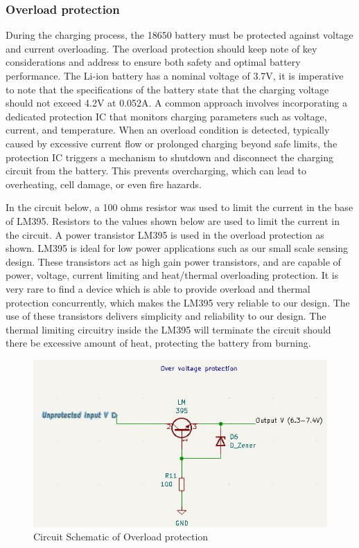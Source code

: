 \documentclass[class=report,11pt,crop=false]{standalone}
\begin{document}
	\subsubsection{Overload protection}
	\vspace{0.5cm}
	During the charging process, the 18650 battery must be protected against voltage and current overloading. The overload protection should keep note of key considerations and address to ensure both safety and optimal battery performance. The Li-ion battery has a nominal voltage of 3.7V, it is imperative to note that the specifications of the battery state that the charging voltage should not exceed 4.2V at 0.052A. A common approach involves incorporating a dedicated protection IC that monitors charging parameters such as voltage, current, and temperature. When an overload condition is detected, typically caused by excessive current flow or prolonged charging beyond safe limits, the protection IC triggers a mechanism to shutdown and disconnect the charging circuit from the battery. This prevents overcharging, which can lead to overheating, cell damage, or even fire hazards.
	
	In the circuit below, a 100 ohms resistor was used to limit the current in the base of LM395. Resistors to the values shown below are used to limit the current in the circuit. A power transistor LM395 is used in the overload protection as shown. LM395 is ideal for low power applications such as our small scale sensing design. These transistors act as high gain power transistors, and are capable of power, voltage, current limiting and heat/thermal overloading protection. It is very rare to find a device which is able to provide overload and thermal protection concurrently, which makes the LM395 very reliable to our design. The use of these transistors delivers simplicity and reliability to our design. The thermal limiting circuitry inside the LM395 will terminate the circuit should there be excessive amount of heat, protecting the battery from burning. 
	
	\begin{figure}[h!]
		\centering
		\includegraphics[width=0.9\linewidth]{Figures/Overload protection.jpg}
		\caption{Circuit Schematic of Overload protection}
		\label{fig:P3}
	\end{figure}
	
\end{document}
